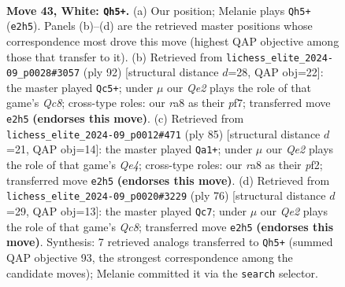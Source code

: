 \documentclass[11pt]{article}
\begin{document}
\clearpage

\begin{figure}[p]\centering
\begin{subfigure}{0.46\textwidth}\centering
\resizebox{\linewidth}{!}{%
\newchessgame
\chessboard[
  setfen={r7/5k2/5p2/3p4/3q1P2/p5P1/P3Q1KP/8 w - - 5 43},
  showmover=false,
  pgfstyle=straightmove, color=movearrow, markmove={e2-h5}
]}
\caption{}
\end{subfigure}\hfill
\begin{subfigure}{0.46\textwidth}\centering
\resizebox{\linewidth}{!}{%
\newchessgame
\chessboard[
  setfen={2Q5/4kp2/8/3pq1p1/7p/4P2P/6P1/6K1 w - - 4 47},
  showmover=false,
  pgfstyle=straightmove, color=movearrow, markmove={c8-c5}
]}
\caption{}
\end{subfigure}
\\[4pt]
\begin{subfigure}{0.46\textwidth}\centering
\resizebox{\linewidth}{!}{%
\newchessgame
\chessboard[
  setfen={8/5pk1/6p1/4q3/Q3p2p/7P/P4PP1/6K1 b - - 4 43},
  showmover=false,
  pgfstyle=straightmove, color=movearrow, markmove={e5-a1}
]}
\caption{}
\end{subfigure}\hfill
\begin{subfigure}{0.46\textwidth}\centering
\resizebox{\linewidth}{!}{%
\newchessgame
\chessboard[
  setfen={2Q5/5p1k/6pp/8/4qPP1/6K1/5P2/8 w - - 5 39},
  showmover=false,
  pgfstyle=straightmove, color=movearrow, markmove={c8-c7}
]}
\caption{}
\end{subfigure}
\caption{\textbf{Move 43, White: \texttt{Qh5+}.} (a) Our position; Melanie plays \texttt{Qh5+} (\texttt{e2h5}). Panels (b)--(d) are the retrieved master positions whose correspondence most drove this move (highest QAP objective among those that transfer to it). (b) Retrieved from \texttt{lichess\_elite\_2024-09\_p0028\#3057} (ply 92) [structural distance $d$=28, QAP obj=22]: the master played \texttt{Qc5+}; under $\mu$ our \emph{Qe2} plays the role of that game's \emph{Qc8}; cross-type roles: our \emph{r}a8 as their \emph{p}f7; transferred move \texttt{e2h5} \textbf{(endorses this move)}. (c) Retrieved from \texttt{lichess\_elite\_2024-09\_p0012\#471} (ply 85) [structural distance $d$=21, QAP obj=14]: the master played \texttt{Qa1+}; under $\mu$ our \emph{Qe2} plays the role of that game's \emph{Qe4}; cross-type roles: our \emph{r}a8 as their \emph{p}f2; transferred move \texttt{e2h5} \textbf{(endorses this move)}. (d) Retrieved from \texttt{lichess\_elite\_2024-09\_p0020\#3229} (ply 76) [structural distance $d$=29, QAP obj=13]: the master played \texttt{Qc7}; under $\mu$ our \emph{Qe2} plays the role of that game's \emph{Qc8}; transferred move \texttt{e2h5} \textbf{(endorses this move)}. Synthesis: 7 retrieved analogs transferred to \texttt{Qh5+} (summed QAP objective 93, the strongest correspondence among the candidate moves); Melanie committed it via the \texttt{search} selector.}
\label{fig:thought-m84}
\end{figure}
\end{document}
